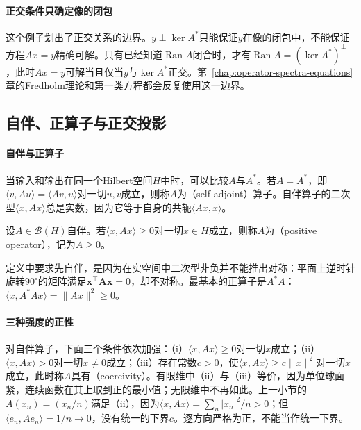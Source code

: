 \paragraph{正交条件只确定像的闭包}
这个例子划出了正交关系的边界。$y\perp\ker A^*$只能保证$y$在像的闭包中，不能保证方程$Ax=y$精确可解。只有已经知道$\operatorname{Ran}A$闭合时，才有$\operatorname{Ran}A=(\ker A^*)^\perp$，此时$Ax=y$可解当且仅当$y$与$\ker A^*$正交。第~\ref{chap:operator-spectra-equations}章的Fredholm理论和第一类方程都会反复使用这一边界。

\subsection{自伴、正算子与正交投影}
\label{sec:lfo-self-adjoint}

\paragraph{自伴与正算子}
当输入和输出在同一个Hilbert空间$H$中时，可以比较$A$与$A^*$。若$A=A^*$，即$\langle v,Au\rangle=\langle Av,u\rangle$对一切$u,v$成立，则称$A$为（self-adjoint）算子。自伴算子的二次型$\langle x,Ax\rangle$总是实数，因为它等于自身的共轭$\langle Ax,x\rangle$。

\begin{definition}[正算子]
\label{def:lfo-positive-operator}
设$A\in\mathcal B(H)$自伴。若$\langle x,Ax\rangle\geq0$对一切$x\in H$成立，则称$A$为（positive operator），记为$A\geq0$。
\end{definition}

定义中要求先自伴，是因为在实空间中二次型非负并不能推出对称：平面上逆时针旋转$90^\circ$的矩阵满足$\bm x^{\top}\bm A\bm x=0$，却不对称。最基本的正算子是$A^*A$：$\langle x,A^*Ax\rangle=\|Ax\|^2\geq0$。

\paragraph{三种强度的正性}
对自伴算子，下面三个条件依次加强：（i）$\langle x,Ax\rangle\geq0$对一切$x$成立；（ii）$\langle x,Ax\rangle>0$对一切$x\neq0$成立；（iii）存在常数$c>0$，使$\langle x,Ax\rangle\geq c\|x\|^2$对一切$x$成立，此时称$A$具有（coercivity）。有限维中（ii）与（iii）等价，因为单位球面紧，连续函数在其上取到正的最小值；无限维中不再如此。上一小节的$A(x_n)=(x_n/n)$满足（ii），因为$\langle x,Ax\rangle=\sum_n|x_n|^2/n>0$；但$\langle e_n,Ae_n\rangle=1/n\to0$，没有统一的下界$c$。逐方向严格为正，不能当作统一下界。

